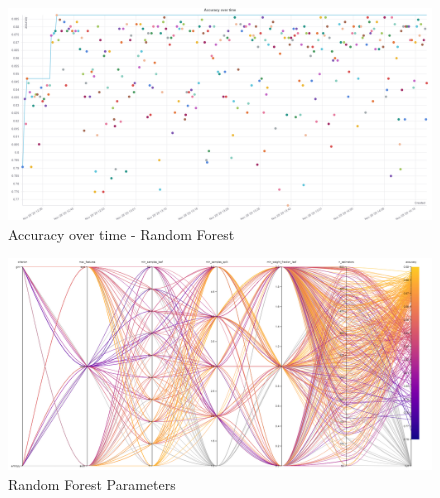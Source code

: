 \documentclass[11pt]{article}
\begin{document}
\begin{appendices}
\begin{figure}
    \caption {Accuracy over time - Random Forest} \label{RFAccOverTime}
    \centering
    \includegraphics[width = \textwidth, height = \textwidth, keepaspectratio]{Images/RF Acc over time.png}
\end{figure}

\begin{figure}
    \caption {Random Forest Parameters} \label{ParallelCoordRF}
    \centering 
    \includegraphics[width = \textwidth, height = \textwidth, keepaspectratio]{Images/RF ParallelCoordGraph.png}
\end{figure}



\end{appendices}
\end{document}
